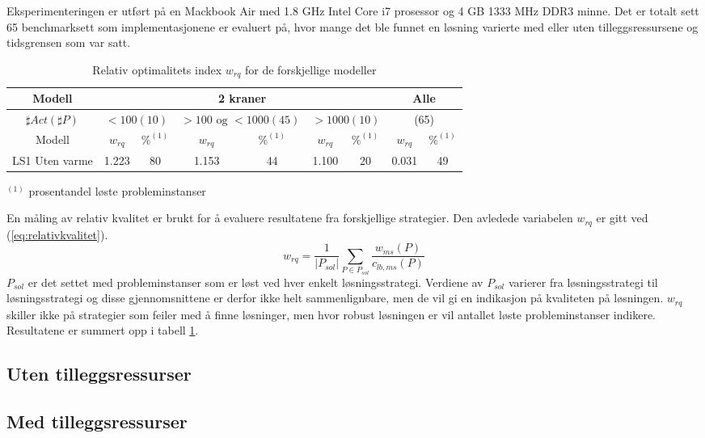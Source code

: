 Eksperimenteringen er utført på en Mackbook Air med 1.8 GHz Intel Core i7 prosessor og 4 GB 1333 MHz DDR3 minne. Det er totalt sett 65 benchmarksett som implementasjonene er evaluert på, hvor mange det ble funnet en løsning varierte med eller uten tilleggsressursene og tidsgrensen som var satt.

\begin{table}[h]
\begin{center}
\begin{tabular}{ | c | c | c | c | c | c | c | c | c | }
\hline
\textbf{Modell} & \multicolumn{6}{|c|}{\textbf{2 kraner}} & \multicolumn{2}{|c|}{\textbf{Alle}} \\ \hline
$\sharp Act(\sharp P)$ & \multicolumn{2}{|c|}{$< 100 (10)$} & \multicolumn{2}{|c|}{$> 100 \text{ og } < 1000 (45)$} & \multicolumn{2}{|c|}{$> 1000 (10)$} & \multicolumn{2}{|c|}{(65)} \\ 
\hline
Modell & $w_{rq}$ & $\%^{(1)}$ & $w_{rq}$ & $\%^{(1)}$ & $w_{rq}$ & $\%^{(1)}$ & $w_{rq}$ & $\%^{(1)}$ \\ \hline
LS1 Uten varme & 1.223 & 80 & 1.153 & 44 & 1.100 & 20 & 0.031 & 49 \\
\hline
\end{tabular}
\end{center}
\caption{Relativ optimalitets index $w_{rq}$ for de forskjellige modeller}
\label{tab:resultaterSum}
\end{table}
$^{(1)}$ prosentandel løste probleminstanser

En måling av relativ kvalitet er brukt for å evaluere resultatene fra forskjellige strategier. Den avledede variabelen $w_{rq}$ er gitt ved (\ref{eq:relativkvalitet}).
\begin{equation}
w_{rq} = \frac{1}{| P_{sol} |} \sum_{P \in P_{sol}} \frac{w_{ms}(P)}{c_{lb,ms}(P)}
\label{eq:relativkvalitet}
\end{equation}
$P_{sol}$ er det settet med probleminstanser som er løst ved hver enkelt løsningsstrategi. Verdiene av $P_{sol}$ varierer fra løsningsstrategi til løsningsstrategi og disse gjennomsnittene er derfor ikke helt sammenlignbare, men de vil gi en indikasjon på kvaliteten på løsningen. $w_{rq}$ skiller ikke på strategier som feiler med å finne løsninger, men hvor robust løsningen er vil antallet løste probleminstanser indikere. Resultatene er summert opp i tabell \ref{tab:resultaterSum}.

\subsection{Uten tilleggsressurser}


\subsection{Med tilleggsressurser}
